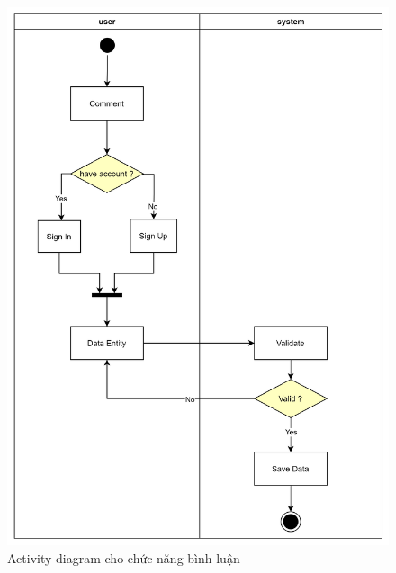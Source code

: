 \newpage
\begin{figure}[h]
    \centering
    \includegraphics[scale = 0.12]{img/activity/comment.png}
    \vspace{1cm}
    \caption{Activity diagram cho chức năng bình luận}
    \label{fig:taskAssignment}
\end{figure}